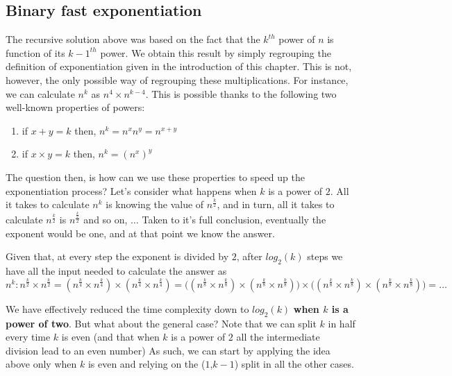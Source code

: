\subsection{Binary fast exponentiation}
\label{exponentiation:sec:fast_exponentiation}
The recursive solution above was based on the fact that the ${k^{th}}$ power of $n$ is function of its ${k-1^{th}}$ power. We obtain this result by simply regrouping the definition of exponentiation given in the introduction of this chapter. This is not, however,  the only possible way of regrouping these multiplications. For instance, we can calculate $n^k$ as $n^{4} \times n^{k-4}$.
This is possible thanks to the following two well-known properties of powers:

\begin{enumerate}
    \item if $x+y=k$ then, $n^k = n^x  n^y = n^{x+y}$ 
    \item if $x \times y=k$ then, $n^k = (n^x)^y$
\end{enumerate}

The question then, is how can we use these properties to speed up the exponentiation process? Let's consider what happens when  $k$ is a power of $2$.
All it takes to calculate $n^k$ is knowing the value of $n^{\frac{k}{2}}$, and in turn, all it takes to calculate $n^{\frac{k}{2}}$ is $n^{\frac{\frac{k}{2}}{2}}$ and so on, $\ldots$ Taken to it's full conclusion,  eventually the exponent would be one, and at that point we know the answer.

Given that,  at every step the exponent is divided by $2$, after $log_2(k)$ steps we have all the input needed to calculate the answer as $n^k : n^{\frac{k}{2}} \times n^{\frac{k}{2}} = (n^{\frac{k}{4}} \times n^{\frac{k}{4}}) \times (n^{\frac{k}{4}} \times n^{\frac{k}{4}}) = \big ( (n^{\frac{k}{8}} \times n^{\frac{k}{8}}) \times (n^{\frac{k}{8}} \times n^{\frac{k}{8}}) \big ) \times \big ( (n^{\frac{k}{8}} \times n^{\frac{k}{8}}) \times (n^{\frac{k}{8}} \times n^{\frac{k}{8}}) \big )  = \ldots$


We have effectively reduced the time complexity down to $log_2(k)$ \textbf{when $k$ is a power of two}.
But what about the general case?  Note that we can split $k$ in half every time $k$ is even (and that when $k$ is a power of $2$ all the intermediate division lead to an even number) As such,  we can start by applying the idea above only when $k$ is even and relying on the ($1$,$k-1$) split in all the other cases. 


